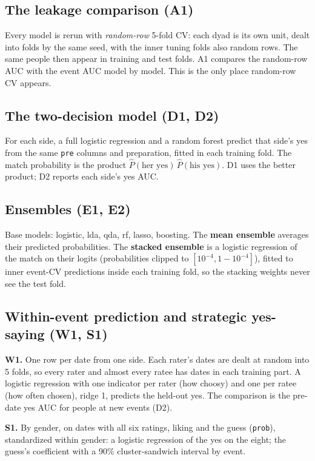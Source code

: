 \documentclass[11pt]{article}
\begin{document}
\subsection{The leakage comparison (A1)}

Every model is rerun with \emph{random-row} 5-fold CV: each dyad is its own unit, dealt into folds by the same
seed, with the inner tuning folds also random rows. The same people then appear in training and test folds. A1 compares
the random-row AUC with the event AUC model by model. This is the only place random-row CV appears.

\subsection{The two-decision model (D1, D2)}

For each side, a full logistic regression and a random forest predict that side's yes from the same \texttt{pre}
columns and preparation, fitted in each training fold. The match probability is the product
$\hat P(\text{her yes})\,\hat P(\text{his yes})$. D1 uses the better product; D2 reports each side's yes AUC.

\subsection{Ensembles (E1, E2)}

Base models: logistic, lda, qda, rf, lasso, boosting. The \textbf{mean ensemble} averages their
predicted probabilities. The \textbf{stacked ensemble} is a logistic regression of the match on their logits (probabilities
clipped to $[10^{-4}, 1 - 10^{-4}]$), fitted to inner event-CV predictions inside each training fold, so the stacking
weights never see the test fold.

\subsection{Within-event prediction and strategic yes-saying (W1, S1)}

\textbf{W1.} One row per date from one side. Each rater's dates are dealt at random into 5 folds, so every rater and
almost every ratee has dates in each training part. A logistic regression with one indicator per rater (how choosy)
and one per ratee (how often chosen), ridge 1, predicts the held-out yes. The comparison is the pre-date yes AUC for
people at new events (D2).

\textbf{S1.} By gender, on dates with all six ratings, liking and the guess (\texttt{prob}), standardized within gender:
a logistic regression of the yes on the eight; the guess's coefficient with a 90\% cluster-sandwich interval by event.
\end{document}
